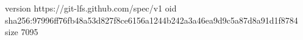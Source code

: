 version https://git-lfs.github.com/spec/v1
oid sha256:97996ff76fb48a53d827f8ce6156a1244b242a3a46ea9d9c5a87d8a91d1f8784
size 7095
